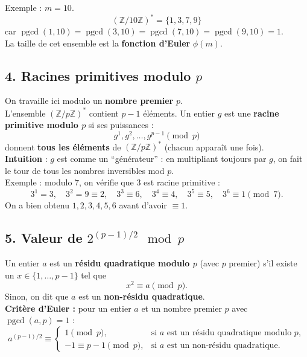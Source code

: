 Exemple : $m = 10$.
\[
(\mathbb{Z}/10\mathbb{Z})^* = \{1,3,7,9\}
\]
car $\operatorname{pgcd}(1,10)=\operatorname{pgcd}(3,10)=\operatorname{pgcd}(7,10)=\operatorname{pgcd}(9,10)=1$. \\

La taille de cet ensemble est la \textbf{fonction d’Euler} $\phi(m)$. \\


\subsection*{4. Racines primitives modulo \( p \)}

On travaille ici modulo un \textbf{nombre premier} $p$. \\

L’ensemble $(\mathbb{Z}/p\mathbb{Z})^*$ contient $p-1$ éléments.  
Un entier $g$ est une \textbf{racine primitive modulo $p$} si ses puissances :
\[
g^1, g^2, \dots, g^{p-1} \pmod{p}
\]
donnent \textbf{tous les éléments} de $(\mathbb{Z}/p\mathbb{Z})^*$ (chacun apparaît une fois). \\

\textbf{Intuition} : $g$ est comme un “générateur” : en multipliant toujours par $g$, on fait le tour de tous les nombres inversibles mod $p$. \\

Exemple : modulo $7$, on vérifie que $3$ est racine primitive :
\[
3^1 = 3,\quad 3^2 = 9 \equiv 2,\quad 3^3 \equiv 6,\quad 3^4 \equiv 4,\quad 3^5 \equiv 5,\quad 3^6 \equiv 1 \pmod{7}.
\]
On a bien obtenu $1,2,3,4,5,6$ avant d'avoir $\equiv 1$. \\


\subsection*{5. Valeur de \( 2^{(p-1)/2} \mod p \)}

Un entier $a$ est un \textbf{résidu quadratique modulo $p$} (avec $p$ premier) s’il existe un $x \in \{1,\dots,p-1\}$ tel que
\[
x^2 \equiv a \pmod{p}.
\]
Sinon, on dit que $a$ est un \textbf{non-résidu quadratique}. \\

\textbf{Critère d’Euler :} pour un entier $a$ et un nombre premier $p$ avec $\operatorname{pgcd}(a,p)=1$ :
\[
a^{(p-1)/2} \equiv
\begin{cases}
1 \pmod{p}, & \text{si $a$ est un résidu quadratique modulo $p$}, \\
-1 \equiv p-1 \pmod{p}, & \text{si $a$ est un non-résidu quadratique}.
\end{cases}
\]

